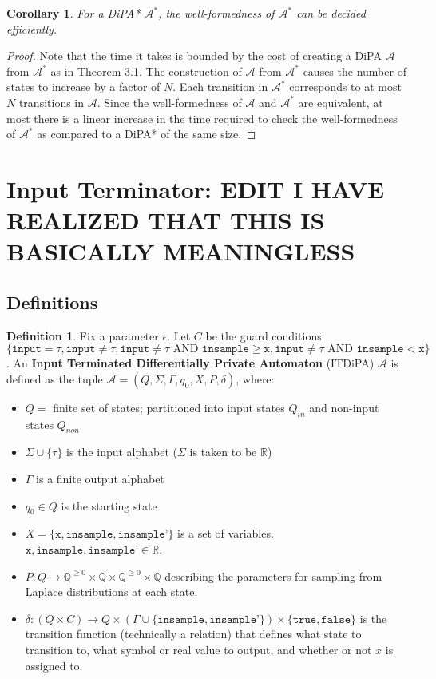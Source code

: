 \documentclass[12pt]{article}
\newcommand{\QQ}{\mathbb{Q}}
\newcommand{\RR}{\mathbb{R}}
\newcommand{\itgguard}{\texttt{input}\neq\tau \text{ AND } \texttt{insample} \geq \texttt{x}}
\newcommand{\itlguard}{\texttt{input}\neq\tau \text{ AND }\texttt{insample} < \texttt{x}}
\newtheorem{cor}[thm]{Corollary}
\theoremstyle{definition}
\newtheorem{defn}[thm]{Definition}
\begin{document}
\begin{cor}
	For a DiPA* $\mathcal{A}^*$, the well-formedness of $\mathcal{A}^*$ can be decided efficiently.
\end{cor}
\begin{proof}
	Note that the time it takes is bounded by the cost of creating a DiPA $\mathcal{A}$ from $\mathcal{A}^*$ as in Theorem 3.1. The construction of $\mathcal{A}$ from $\mathcal{A}^*$ causes the number of states to increase by a factor of $N$. 
	Each transition in $\mathcal{A}^*$ corresponds to at most $N$ transitions in $\mathcal{A}$. Since the well-formedness of $\mathcal{A}$ and $\mathcal{A}^*$ are equivalent, at most there is a linear increase in the time required to check the well-formedness of $\mathcal{A}^*$ as compared to a DiPA* of the same size.
\end{proof}

\newpage

\section{Input Terminator: EDIT I HAVE REALIZED THAT THIS IS BASICALLY MEANINGLESS}

\subsection{Definitions}

\begin{defn}
	Fix a parameter $\epsilon$. Let $C$ be the guard conditions $\{\texttt{input}=\tau, \texttt{input}\neq \tau, \itgguard, \itlguard\}$. An \textbf{Input Terminated Differentially Private Automaton} (ITDiPA) $\mathcal{A}$ is defined as the tuple $\mathcal{A} = (Q, \Sigma, \Gamma, q_0, X, P, \delta)$, where:
	\begin{itemize}
		\item $Q = $ finite set of states; partitioned into input states $Q_{in}$ and non-input states $Q_{non}$
		\item $\Sigma \cup \{\tau\}$ is the input alphabet ($\Sigma$ is taken to be $\RR$)
		\item $\Gamma$ is a finite output alphabet
		\item $q_0\in Q$ is the starting state
		\item $X = \{\texttt{x}, \texttt{insample}, \texttt{insample'}\}$ is a set of variables. $\texttt{x}, \texttt{insample}, \texttt{insample'} \in \RR$.
		\item $P: Q \to \QQ^{\geq 0} \times \QQ \times \QQ^{\geq 0} \times \QQ$ describing the parameters for sampling from Laplace distributions at each state.
		\item $\delta: (Q \times C) \to Q\times (\Gamma \cup \{\texttt{insample}, \texttt{insample'}\}) \times \{\texttt{true}, \texttt{false}\}$ is the transition function (technically a relation) that defines what state to transition to, what symbol or real value to output, and whether or not $x$ is assigned to.
	\end{itemize}
\end{defn}
\end{document}
